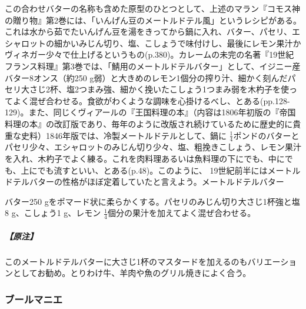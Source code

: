 \begin{recette}
{{{{  この合わせバターの名称も含めた原型のひとつとして、上述のマラン『コモス神の贈り物』第2巻には、「いんげん豆のメートルドテル風」というレシピがある。これは水から茹でたいんげん豆を湯をきってから鍋に入れ、バター、パセリ、エシャロットの細かいみじん切り、塩、こしょうで味付けし、最後にレモン果汁かヴィネガー少々で仕上げるというもの(p.380)。カレームの未完の名著『19世紀フランス料理』第3巻では、「鯖用のメートルドテルバター」として、イジニー産バター8オンス（約250
  g弱）と大きめのレモン1個分の搾り汁、細かく刻んだパセリ大さじ2杯、塩2つまみ強、細かく挽いたこしょう1つまみ弱を木杓子を使ってよく混ぜ合わせる。食欲がわくような調味を心掛けるべし、とある(pp.128-129)。また、同じくヴィアールの『王国料理の本』（内容は1806年初版の『帝国料理の本』の改訂版であり、毎年のように改版され続けているために歴史的に貴重な史料）1846年版では、冷製メートルドテルとして、鍋に
  \(\frac{1}{4}\)ポンドのバターとパセリ少々、エシャロットのみじん切り少々、塩、粗挽きこしょう、レモン果汁を入れ、木杓子でよく練る。これを肉料理あるいは魚料理の下にでも、中にでも、上にでも流すといい、とある(p.48)。このように、
  19世紀前半にはメートルドテルバターの性格がほぼ定着していたと言えよう。}}{メートルドテルバター}}\label{beurre-maitre-d-hotel}}



バター250
gをポマード状に柔らかくする。パセリのみじん切り大さじ1杯強と塩8
g、こしょう1 g、レモン
\(\frac{1}{4}\)個分の果汁を加えてよく混ぜ合わせる。

\hypertarget{nota-beurre-maitre-d-hotel}{%
\subparagraph{【原注】}\label{nota-beurre-maitre-d-hotel}}

このメートルドテルバターに大さじ1杯のマスタードを加えるのもバリエーションとしてお勧め。とりわけ牛、羊肉や魚のグリル焼きによく合う。

\hypertarget{beurre-manie}{%
\subsubsection{ブールマニエ}\label{beurre-manie}}




\end{recette}
